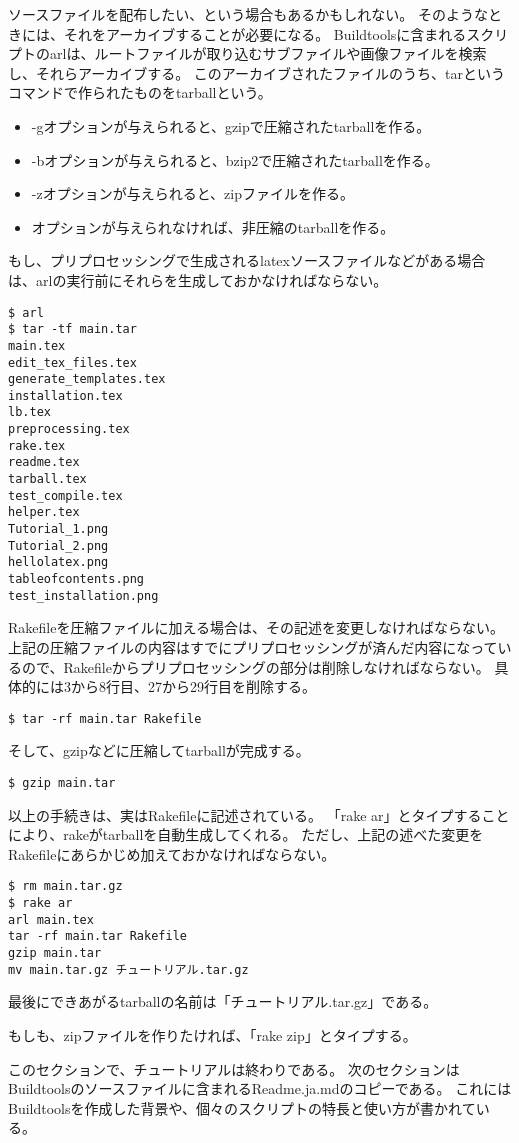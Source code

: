 ソースファイルを配布したい、という場合もあるかもしれない。
そのようなときには、それをアーカイブすることが必要になる。
Buildtoolsに含まれるスクリプトのarlは、ルートファイルが取り込むサブファイルや画像ファイルを検索し、それらアーカイブする。
このアーカイブされたファイルのうち、tarというコマンドで作られたものをtarballという。
\begin{itemize}
\item -gオプションが与えられると、gzipで圧縮されたtarballを作る。
\item -bオプションが与えられると、bzip2で圧縮されたtarballを作る。
\item -zオプションが与えられると、zipファイルを作る。
\item オプションが与えられなければ、非圧縮のtarballを作る。
\end{itemize}

もし、プリプロセッシングで生成されるlatexソースファイルなどがある場合は、arlの実行前にそれらを生成しておかなければならない。
\begin{verbatim}
$ arl
$ tar -tf main.tar
main.tex
edit_tex_files.tex
generate_templates.tex
installation.tex
lb.tex
preprocessing.tex
rake.tex
readme.tex
tarball.tex
test_compile.tex
helper.tex
Tutorial_1.png
Tutorial_2.png
hellolatex.png
tableofcontents.png
test_installation.png
\end{verbatim}

Rakefileを圧縮ファイルに加える場合は、その記述を変更しなければならない。
上記の圧縮ファイルの内容はすでにプリプロセッシングが済んだ内容になっているので、Rakefileからプリプロセッシングの部分は削除しなければならない。
具体的には3から8行目、27から29行目を削除する。
\begin{verbatim}
$ tar -rf main.tar Rakefile
\end{verbatim}
そして、gzipなどに圧縮してtarballが完成する。
\begin{verbatim}
$ gzip main.tar
\end{verbatim}

以上の手続きは、実はRakefileに記述されている。
「rake ar」とタイプすることにより、rakeがtarballを自動生成してくれる。
ただし、上記の述べた変更をRakefileにあらかじめ加えておかなければならない。
\begin{verbatim}
$ rm main.tar.gz
$ rake ar
arl main.tex
tar -rf main.tar Rakefile
gzip main.tar
mv main.tar.gz チュートリアル.tar.gz
\end{verbatim}
最後にできあがるtarballの名前は「チュートリアル.tar.gz」である。

もしも、zipファイルを作りたければ、「rake zip」とタイプする。

このセクションで、チュートリアルは終わりである。
次のセクションはBuildtoolsのソースファイルに含まれるReadme.ja.mdのコピーである。
これにはBuildtoolsを作成した背景や、個々のスクリプトの特長と使い方が書かれている。

